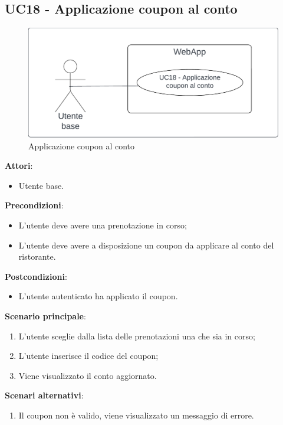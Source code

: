 \subsection{UC18 - Applicazione coupon al conto} \label{usecase:18}
\begin{figure}[H]
    \centering
    \includegraphics[width=0.9\linewidth]{ucd/ucd18.png}
    \caption{Applicazione coupon al conto}
\end{figure}
\textbf{Attori}:
\begin{itemize}
    \item Utente base.
\end{itemize}
\textbf{Precondizioni}:
\begin{itemize}
    \item L'utente deve avere una prenotazione in corso;
    \item L'utente deve avere a disposizione un coupon da applicare al conto del ristorante.
\end{itemize}
\textbf{Postcondizioni}:
\begin{itemize}
    \item L'utente autenticato ha applicato il coupon.
\end{itemize}
\textbf{Scenario principale}:
\begin{enumerate}
    \item L'utente sceglie dalla lista delle prenotazioni una che sia in corso;
    \item L'utente inserisce il codice del coupon;
    \item Viene visualizzato il conto aggiornato.
\end{enumerate}
\textbf{Scenari alternativi}:
\begin{enumerate}
    \item Il coupon non è valido, viene visualizzato un messaggio di errore.
\end{enumerate}
\newpage